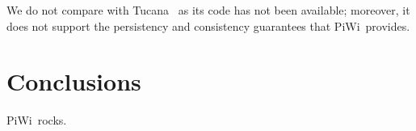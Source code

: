 \documentclass[10pt,preprint,numbers]{sigplanconf}
\newcommand{\sys}{PiWi}
\begin{document}
We do not compare with Tucana~\cite{tucana} as its code has not been available; moreover, it does not support the persistency and consistency guarantees that \sys\ provides. 

\section{Conclusions}
\label{sec:conclusions}
\sys\ rocks.


 
\end{document}
